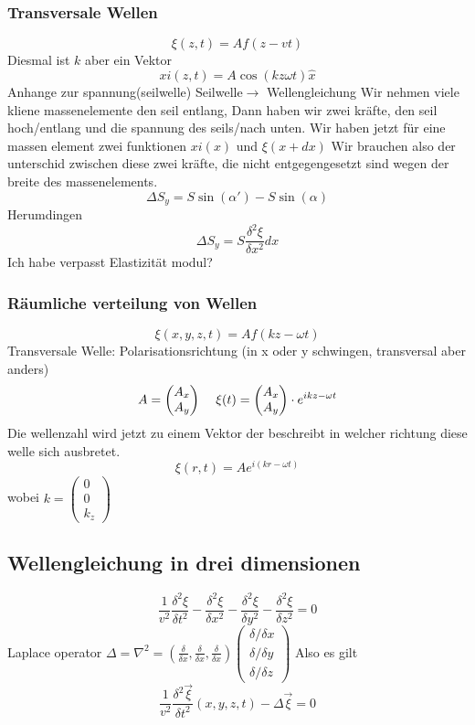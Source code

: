 \documentclass{article}
\newcommand{\mspc}{\hspace{0.4cm}}
\begin{document}
\subsubsection{Transversale Wellen}
\[\xi(z,t)=Af(z-vt)\]
Diesmal ist $k$  aber ein Vektor
\[xi(z,t)=A\cos(kz\omega t)\hat{x}\]
Anhange zur spannung(seilwelle) Seilwelle$\rightarrow$ Wellengleichung
Wir nehmen viele kliene massenelemente den seil entlang, Dann haben wir zwei kräfte, den seil hoch/entlang und die spannung des seils/nach unten. Wir haben jetzt für eine massen element zwei funktionen $xi(x)$ und $\xi(x+dx)$ Wir brauchen also der unterschid zwischen diese zwei kräfte, die nicht entgegengesetzt sind wegen der breite des massenelements.
\[\Delta S_y=S\sin(\alpha')-S\sin(\alpha)\]
Herumdingen
\[\Delta S_y=S\frac{\delta^2\xi}{\delta x^2} dx\]
Ich habe verpasst Elastizität modul?
\subsubsection{Räumliche verteilung von Wellen}
\[\xi(x,y,z,t)=Af(kz-\omega t)\]
Transversale Welle: Polarisationsrichtung (in x oder y schwingen, transversal aber anders)
\[A=\begin{pmatrix}A_x\\A_y\end{pmatrix}\mspc \xi(t)=\begin{pmatrix}A_x\\A_y\end{pmatrix}\cdot e^{ikz-\omega t}\]
Die wellenzahl wird jetzt zu einem Vektor der beschreibt in welcher richtung diese welle sich ausbretet. 
\[\xi(r, t)=Ae^{i(kr-\omega t)}\] wobei $k=\begin{pmatrix}0\\0\\k_z\end{pmatrix}$
\subsection{Wellengleichung in drei dimensionen}
\[\frac{1}{v^2}\frac{\delta^2\xi}{\delta t^2}-\frac{\delta^2\xi}{\delta x^2}-\frac{\delta^2\xi}{\delta y^2}-\frac{\delta^2\xi}{\delta z^2}=0\]
Laplace operator $\Delta=\nabla^2=\left(\frac{\delta}{\delta x},\frac{\delta}{\delta x},\frac{\delta}{\delta x}\right)\begin{pmatrix}\delta/\delta x\\\delta/\delta y\\\delta/\delta z\end{pmatrix}$ Also es gilt \[\frac{1}{v^2}\frac{\delta^2\vec{\xi}}{\delta t^2}(x,y,z,t)-\Delta\vec{\xi}=0\]
\end{document}
